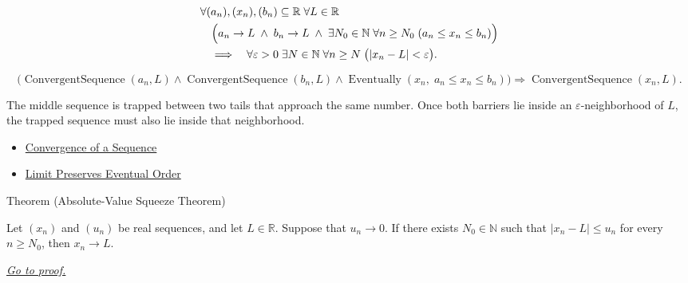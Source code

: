 \begin{remark*}
\[
\begin{aligned}
&\forall (a_n),(x_n),(b_n)\subseteq\mathbb{R}\;\forall L\in\mathbb{R}\\
&\quad\Bigl(
  a_n\to L
  \;\land\;
  b_n\to L
  \;\land\;
  \exists N_0\in\mathbb{N}\;\forall n\ge N_0\;(a_n\le x_n\le b_n)
\Bigr)\\
&\quad\Longrightarrow\quad
\forall \varepsilon>0\;\exists N\in\mathbb{N}\;\forall n\ge N\;
\bigl(|x_n-L|<\varepsilon\bigr).
\end{aligned}
\]
\end{remark*}

\begin{remark*}
\[
\bigl(
\operatorname{ConvergentSequence}(a_n,L)
\land
\operatorname{ConvergentSequence}(b_n,L)
\land
\operatorname{Eventually}(x_n,\;a_n\le x_n\le b_n)
\bigr)
\Longrightarrow
\operatorname{ConvergentSequence}(x_n,L).
\]
\end{remark*}

\begin{remark*}[Interpretation]
The middle sequence is trapped between two tails that approach the same
number. Once both barriers lie inside an $\varepsilon$-neighborhood of $L$,
the trapped sequence must also lie inside that neighborhood.
\end{remark*}

\begin{dependencies}
\begin{itemize}
  \item \hyperref[def:convergent-sequence]{Convergence of a Sequence}
  \item \hyperref[thm:limit-preserves-eventual-order]{Limit Preserves Eventual Order}
\end{itemize}
\end{dependencies}


\begin{theorembox}{Theorem (Absolute-Value Squeeze Theorem)}
\begin{theorem}
\label{thm:absolute-value-squeeze-theorem}

Let $(x_n)$ and $(u_n)$ be real sequences, and let $L\in\mathbb{R}$.
Suppose that $u_n\to 0$. If there exists $N_0\in\mathbb{N}$ such that
$|x_n-L|\le u_n$ for every $n\ge N_0$, then $x_n\to L$.

\smallskip
\noindent
\hyperref[prf:absolute-value-squeeze-theorem]{\textit{Go to proof.}}
\end{theorem}
\end{theorembox}

